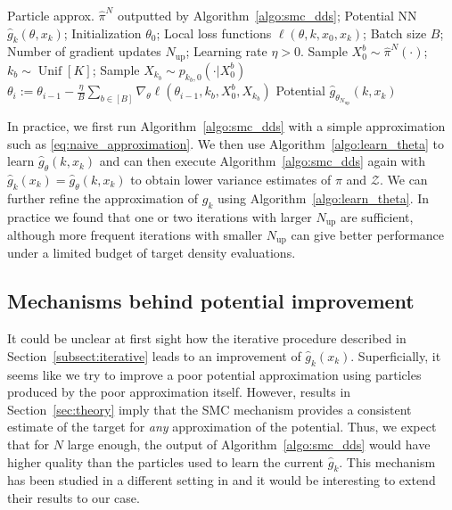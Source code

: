 \documentclass{article}
\theoremstyle{plain}
\theoremstyle{definition}
\theoremstyle{remark}
\begin{document}
\newcommand{\Nupdate}{N_{\mathrm{up}}}
\begin{algorithm}[tb]
	\caption{Potential neural network training}
	\label{algo:learn_theta}
	\begin{algorithmic}
		\REQUIRE Particle approx. $\hat{\pi}^N$ outputted by Algorithm~\ref{algo:smc_dds}; Potential NN $\hat g_k(\theta, x_k)$; Initialization $\theta_0$; Local loss functions $\ell(\theta, k, x_0, x_k)$; Batch size $B$; Number of gradient updates $\Nupdate$; Learning rate $\eta>0$.
		\FOR{$i = 1, 2, \ldots, \Nupdate$}
		\STATE Sample $X^{b}_0 \sim \hat{\pi}^N(\cdot)$; $k_b \sim \operatorname{Unif}[K]$;
		\STATE Sample $X_{k_b} \sim p_{k_b, 0}(\cdot|X_0^{b})$
		\ENDFOR
		\STATE $\theta_i := \theta_{i-1} -  \tfrac{\eta}{B}\sum_{b\in[B]} \nabla_{\theta}\ell(\theta_{i-1},k_b, X_0^{b}, X_{k_b})$
		\ENDFOR
		\ENSURE Potential $\hat g_{\theta_{\Nupdate}}(k, x_k)$
	\end{algorithmic}
\end{algorithm}
In practice, we first run Algorithm~\ref{algo:smc_dds} with a simple approximation such as \eqref{eq:naive_approximation}. We then use Algorithm~\ref{algo:learn_theta} to learn $\hat g_\theta(k, x_k)$ and can then execute Algorithm~\ref{algo:smc_dds} again with $\hat g_k(x_k)=\hat g_\theta(k, x_k)$ to obtain lower variance estimates of $\pi$ and $\mathcal{Z}$. We can further refine the approximation of $g_k$ using Algorithm~\ref{algo:learn_theta}. In practice we found that one or two iterations with larger $N_{\text{up}}$ are sufficient, although more frequent iterations  with smaller $N_{\text{up}}$ can give better performance under a limited budget of target density evaluations.

\subsection{Mechanisms behind potential improvement}
\label{sec:potential_iterations}
It could be unclear at first sight how the iterative procedure described in Section~\ref{subsect:iterative} leads to an improvement of $\hat g_k(x_k)$. Superficially, it seems like we try to improve a poor potential approximation using particles produced by the poor approximation itself. However, results in Section~\ref{sec:theory} imply that the SMC mechanism provides a consistent estimate of the target for \textit{any} approximation of the potential. Thus, we expect that for $N$ large enough, the output of Algorithm~\ref{algo:smc_dds} would have higher quality than the particles used to learn the current $\hat g_k$. This mechanism has been studied in a different setting in \citet{heng2020controlled} and it would be interesting to extend their results to our case.
\end{document}
